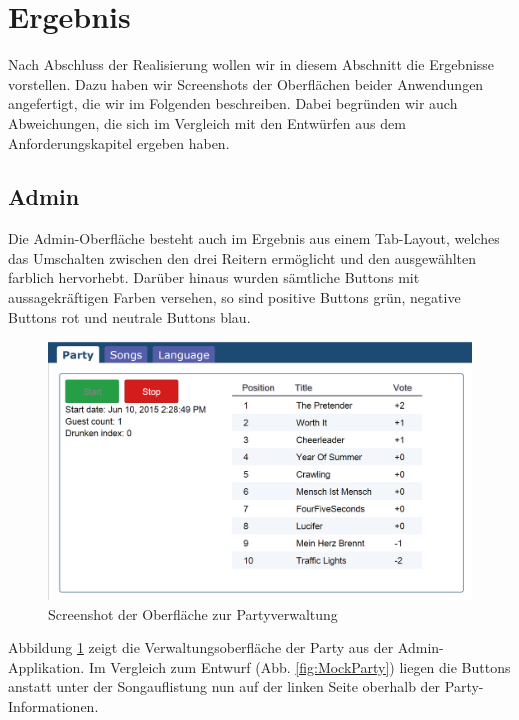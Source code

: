 \section{Ergebnis}
Nach Abschluss der Realisierung wollen wir in diesem Abschnitt die Ergebnisse vorstellen. Dazu haben wir Screenshots der Oberflächen beider Anwendungen angefertigt, die wir im Folgenden beschreiben. Dabei begründen wir auch Abweichungen, die sich im Vergleich mit den Entwürfen aus dem Anforderungskapitel ergeben haben.

\subsection{Admin}
Die Admin-Oberfläche besteht auch im Ergebnis aus einem Tab-Layout, welches das Umschalten zwischen den drei Reitern ermöglicht und den ausgewählten farblich hervorhebt. Darüber hinaus wurden sämtliche Buttons mit aussagekräftigen Farben versehen, so sind positive Buttons grün, negative Buttons rot und neutrale Buttons blau.

\begin{figure}[H]
\centering
\includegraphics[width=0.9\linewidth]{Bilder/Screenshot-Admin-Party}
\caption{Screenshot der Oberfläche zur Partyverwaltung}
\label{fig:Screenshot-Admin-Party}
\end{figure}

Abbildung \ref{fig:Screenshot-Admin-Party} zeigt die Verwaltungsoberfläche der Party aus der Admin-Applikation. Im Vergleich zum Entwurf (Abb. \ref{fig:MockParty}) liegen die Buttons anstatt unter der Songauflistung nun auf der linken Seite oberhalb der Party-Informationen.

